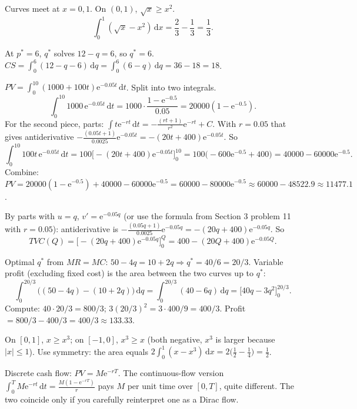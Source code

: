\begin{solutions}
  \item Curves meet at $x=0,1$. On $(0,1)$, $\sqrt{x}\ge x^{2}$.
        \[
          \int_{0}^{1} (\sqrt{x}-x^{2})\,\mathrm{d}x=\frac{2}{3}-\frac{1}{3}=\frac{1}{3} .
        \]

  \item At $p^{*}=6$, $q^{*}$ solves $12-q=6$, so $q^{*}=6$.
        $CS=\int_{0}^{6} (12-q-6)\,\mathrm{d}q=\int_{0}^{6}(6-q)\,\mathrm{d}q
        =36-18=18$.

  \item $PV=\int_{0}^{10} (1000+100t)\mathrm{e}^{-0.05t}\,\mathrm{d}t$.
        Split into two integrals.
        \[
          \int_{0}^{10} 1000\,\mathrm{e}^{-0.05t}\,\mathrm{d}t
            =1000\cdot\frac{1-\mathrm{e}^{-0.5}}{0.05}=20000(1-\mathrm{e}^{-0.5}) .
        \]
        For the second piece, parts:
        $\int t\mathrm{e}^{-rt}\,\mathrm{d}t
          =-\frac{(rt+1)}{r^{2}}\mathrm{e}^{-rt}+C$. With $r=0.05$ that
        gives antiderivative
        $-\frac{(0.05t+1)}{0.0025}\mathrm{e}^{-0.05t}
          =-(20t+400)\mathrm{e}^{-0.05t}$. So
        \[
          \int_{0}^{10} 100t\,\mathrm{e}^{-0.05t}\,\mathrm{d}t
            =100\bigl[-(20t+400)\mathrm{e}^{-0.05t}\bigr]_{0}^{10}
            =100\bigl(-600\mathrm{e}^{-0.5}+400\bigr)
            =40000-60000\mathrm{e}^{-0.5} .
        \]
        Combine: $PV=20000(1-\mathrm{e}^{-0.5})+40000-60000\mathrm{e}^{-0.5}
        =60000-80000\mathrm{e}^{-0.5}\approx 60000-48522.9\approx 11477.1$.

  \item By parts with $u=q$, $v'=\mathrm{e}^{-0.05q}$ (or use the
        formula from Section 3 problem 11 with $r=0.05$): antiderivative
        is $-\frac{(0.05q+1)}{0.0025}\mathrm{e}^{-0.05q}
        =-(20q+400)\mathrm{e}^{-0.05q}$. So
        \[
          TVC(Q)=\bigl[-(20q+400)\mathrm{e}^{-0.05q}\bigr]_{0}^{Q}
            =400-(20Q+400)\mathrm{e}^{-0.05Q} .
        \]

  \item Optimal $q^{*}$ from $MR=MC$: $50-4q=10+2q\Rightarrow
        q^{*}=40/6=20/3$. Variable profit (excluding fixed cost) is the
        area between the two curves up to $q^{*}$:
        \[
          \int_{0}^{20/3} \bigl((50-4q)-(10+2q)\bigr)\,\mathrm{d}q
            =\int_{0}^{20/3} (40-6q)\,\mathrm{d}q
            =\bigl[40q-3q^{2}\bigr]_{0}^{20/3} .
        \]
        Compute: $40\cdot 20/3=800/3$; $3(20/3)^{2}=3\cdot 400/9=400/3$.
        Profit $=800/3-400/3=400/3\approx 133.33$.

  \item On $[0,1]$, $x\ge x^{3}$; on $[-1,0]$, $x^{3}\ge x$ (both
        negative, $x^{3}$ is larger because $|x|\le 1$). Use symmetry:
        the area equals $2\int_{0}^{1} (x-x^{3})\,\mathrm{d}x
        =2\bigl(\tfrac12-\tfrac14\bigr)=\tfrac12$.

  \item Discrete cash flow: $PV=M\mathrm{e}^{-rT}$. The continuous-flow
        version $\int_{0}^{T} M\mathrm{e}^{-rt}\,\mathrm{d}t
        =\frac{M(1-\mathrm{e}^{-rT})}{r}$ pays $M$ per unit time over
        $[0,T]$, quite different. The two coincide only if you
        carefully reinterpret one as a Dirac flow.
\end{solutions}

